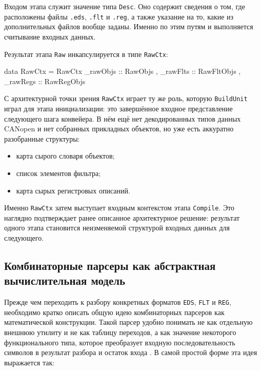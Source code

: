 \documentclass[a4paper,12pt]{article}
\begin{document}
Входом этапа служит значение типа \texttt{Desc}. Оно содержит сведения о том, где
расположены файлы \texttt{.eds}, \texttt{.flt} и \texttt{.reg}, а также указание на то,
какие из дополнительных файлов вообще заданы. Именно по этим путям и выполняется
считывание входных данных.

Результат этапа \texttt{Raw} инкапсулируется в типе \texttt{RawCtx}:

\begin{flushleft}
\label{lst:rawctx}
\begin{MyCodes}
data RawCtx = RawCtx
  { _rawObjs :: RawObjs
  , _rawFlts :: RawFltObjs
  , _rawRegs :: RawRegObjs
  }
\end{MyCodes}
\end{flushleft}

С архитектурной точки зрения \texttt{RawCtx} играет ту же роль, которую \texttt{BuildUnit} играл для
этапа инициализации: это завершённое входное представление следующего шага конвейера.
В нём ещё нет декодированных типов данных CANopen и нет собранных прикладных объектов,
но уже есть аккуратно разобранные структуры:
\begin{itemize}
  \item карта сырого словаря объектов;
  \item список элементов фильтра;
  \item карта сырых регистровых описаний.
\end{itemize}

Именно \texttt{RawCtx} затем выступает входным контекстом этапа \texttt{Compile}. Это
наглядно подтверждает ранее описанное архитектурное решение: результат одного этапа
становится неизменяемой структурой входных данных для следующего.

\subsection{Комбинаторные парсеры как абстрактная вычислительная модель}

Прежде чем переходить к разбору конкретных форматов \texttt{EDS}, \texttt{FLT} и
\texttt{REG}, необходимо кратко описать общую идею комбинаторных парсеров как
математической конструкции. Такой парсер удобно понимать не как отдельную внешнюю
утилиту и не как таблицу переходов, а как значение некоторого функционального типа,
которое преобразует входную последовательность символов в результат разбора и остаток
входа \cite{hutton_meijer_1998,leijen_meijer_2001,hackage_parsec}. В самой простой форме
эта идея выражается так:
\end{document}
